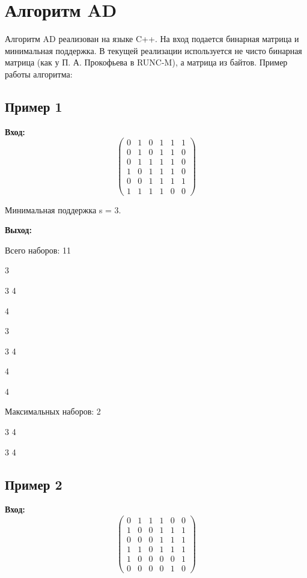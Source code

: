 \documentclass[a4paper, 12pt, oneside]{scrartcl}
\begin{document}
\section{Алгоритм AD}

Алгоритм AD реализован на языке C++. На вход подается бинарная матрица и минимальная поддержка. В текущей реализации используется не чисто бинарная матрица (как у П. А. Прокофьева в RUNC-M), а матрица из байтов. Пример работы алгоритма:

\subsection{Пример 1}

\textbf{Вход:}
\begin{equation}
\begin{pmatrix} 
  0 & 1 & 0 & 1 & 1 & 1\\ 
  0 & 1 & 0 & 1 & 1 & 0\\ 
  0 & 1 & 1 & 1 & 1 & 0\\ 
  1 & 0 & 1 & 1 & 1 & 0\\ 
  0 & 0 & 1 & 1 & 1 & 1\\ 
  1 & 1 & 1 & 1 & 0 & 0
\end{pmatrix}
\end{equation}

\quad Минимальная поддержка s = 3.

\textbf{Выход:}

\quad Всего наборов: 11


 3

 3 4

 4

 3

 3 4

 4


 4


\quad Максимальных наборов: 2

 3 4

 3 4

\subsection{Пример 2}

\textbf{Вход:}
\begin{equation}
\begin{pmatrix} 
  0 & 1 & 1 & 1 & 0 & 0\\ 
  1 & 0 & 0 & 1 & 1 & 1\\ 
  0 & 0 & 0 & 1 & 1 & 1\\ 
  1 & 1 & 0 & 1 & 1 & 1\\ 
  1 & 0 & 0 & 0 & 0 & 1\\ 
  0 & 0 & 0 & 0 & 1 & 0
\end{pmatrix}
\end{equation}
\end{document}
